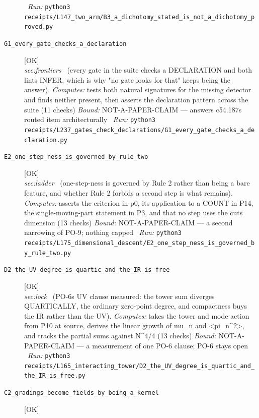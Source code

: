 \begin{description}
\ \emph{Run:} \texttt{python3 receipts/L147\_two\_arm/B3\_a\_dichotomy\_stated\_is\_not\_a\_dichotomy\_proved.py}
\item[\label{rcpt:G1_every_gate_checks_a_declaration}\texttt{G1\_every\_gate\_checks\_a\_declaration}]\hfill\textsf{[OK]}\\
\textit{sec:frontiers} \ (every gate in the suite checks a DECLARATION and both lints INFER, which is why "no gate looks for that" keeps being the answer). 
\emph{Computes:} tests both natural signatures for the missing detector and finds neither present, then asserts the declaration pattern across the suite (11 checks)
 \emph{Bound:} NOT-A-PAPER-CLAIM --- answers c54.187s routed item architecturally
\ \emph{Run:} \texttt{python3 receipts/L237\_gates\_check\_declarations/G1\_every\_gate\_checks\_a\_declaration.py}
\item[\label{rcpt:E2_one_step_ness_is_governed_by_rule_two}\texttt{E2\_one\_step\_ness\_is\_governed\_by\_rule\_two}]\hfill\textsf{[OK]}\\
\textit{sec:ladder} \ (one-step-ness is governed by Rule 2 rather than being a bare feature, and whether Rule 2 forbids a second step is what remains). 
\emph{Computes:} asserts the criterion in p0, its application to a COUNT in P14, the single-moving-part statement in P3, and that no step uses the cuts dimension (13 checks)
 \emph{Bound:} NOT-A-PAPER-CLAIM --- a second narrowing of PO-9; nothing capped
\ \emph{Run:} \texttt{python3 receipts/L175\_dimensional\_descent/E2\_one\_step\_ness\_is\_governed\_by\_rule\_two.py}
\item[\label{rcpt:D2_the_UV_degree_is_quartic_and_the_IR_is_free}\texttt{D2\_the\_UV\_degree\_is\_quartic\_and\_the\_IR\_is\_free}]\hfill\textsf{[OK]}\\
\textit{sec:lock} \ (PO-6s UV clause measured: the tower sum diverges QUARTICALLY, the ordinary zero-point degree, and compactness buys the IR rather than the UV). 
\emph{Computes:} takes the tower and mode action from P10 at source, derives the linear growth of mu\_n and <pi\_n\textasciicircum{}2>, and tracks the partial sums against N\textasciicircum{}4/4 (13 checks)
 \emph{Bound:} NOT-A-PAPER-CLAIM --- a measurement of one PO-6 clause; PO-6 stays open
\ \emph{Run:} \texttt{python3 receipts/L165\_interacting\_tower/D2\_the\_UV\_degree\_is\_quartic\_and\_the\_IR\_is\_free.py}
\item[\label{rcpt:C2_gradings_become_fields_by_being_a_kernel}\texttt{C2\_gradings\_become\_fields\_by\_being\_a\_kernel}]\hfill\textsf{[OK]}\\

\end{description}
